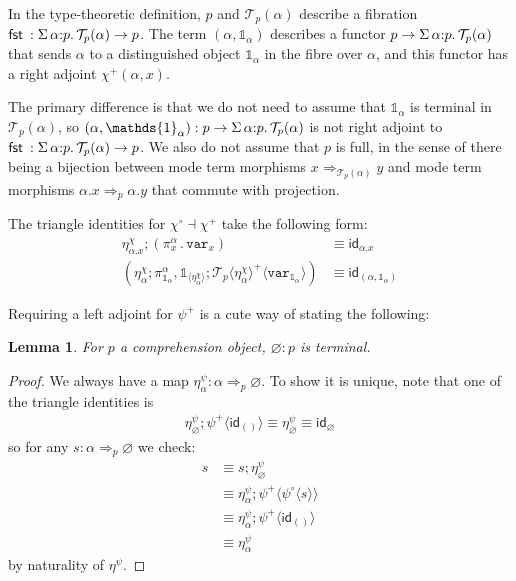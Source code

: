 \documentclass[10pt]{article}
\newtheorem{lemma}{Lemma}
\theoremstyle{definition}
\let\emptyset\varnothing
\newcommand\dsd[1]{\ensuremath{\mathsf{#1}}}
\newcommand{\tcell}{\Rightarrow}
\newcommand{\app}[2]{\ensuremath{#1 \: #2}}
\newcommand{\sigmacl}[3]{\ensuremath{\textnormal{$\Sigma$}\,#1{:}#2.\,#3}}
\newcommand{\fst}[1]{\app{\dsd{fst}}{#1}}
\newcommand{\id}{\mathsf{id}}
\newcommand\TrPlus[2]{\ensuremath{{#1}^+(#2)}}
\newcommand\El[2]{\mathcal{T}_{#1}(#2)}
\newcommand\ApEl[2]{\mathcal{T}_{#1}\langle#2\rangle}
\newcommand\bdot[0]{\mathbin{.}}
\newcommand\ApPlus[2]{\ensuremath{{#1}^+ \langle #2 \rangle }}
\newcommand\ApCirc[2]{\ensuremath{{#1}^\circ \langle #2 \rangle }}
\newcommand\One{\ensuremath{\mathds{1}}}
\newcommand\var[1]{\ensuremath{\mathtt{var}_{#1}}}
\newcommand\ApOne[1]{\ensuremath{\One_{\langle {#1} \rangle }}}
\begin{document}
In the type-theoretic definition, $p$ and $\El{p}{\alpha}$ describe a fibration $\fst : \sigmacl{\alpha}{p}{\El{p}{\alpha}} \to p$. The term $(\alpha, \One_\alpha)$ describes a functor $p \to \sigmacl{\alpha}{p}{\El{p}{\alpha}}$ that sends $\alpha$ to a distinguished object $\One_\alpha$ in the fibre over $\alpha$, and this functor has a right adjoint $\TrPlus{\chi}{\alpha,x}$.

The primary difference is that we do not need to assume that $\One_\alpha$ is terminal in $\El{p}{\alpha}$, so $(\alpha, \One_\alpha) : p \to \sigmacl{\alpha}{p}{\El{p}{\alpha}}$ is not right adjoint to $\fst : \sigmacl{\alpha}{p}{\El{p}{\alpha}} \to p$. We also do not assume that $p$ is full, in the sense of there being a bijection between mode term morphisms $x \tcell_{\El{p}{\alpha}} y$ and mode term morphisms $\alpha.x \tcell_p \alpha.y$ that commute with projection.

The triangle identities for $\chi^\circ \dashv \chi^+$ take the following form:
\begin{align}
\label{eq:chi-triangle-1} \eta^\chi_{\alpha.x};(\pi_x^\alpha \bdot \var{x}) &\equiv \id_{\alpha.x} \\
\label{eq:chi-triangle-2} (\eta^\chi_\alpha ; \pi^\alpha_{\One_\alpha}, \ApOne{\eta^\chi_\alpha} ; \ApPlus{\ApEl{p}{\eta^\chi_\alpha}}{\var{\One_\alpha}}) &\equiv \id_{(\alpha, \One_\alpha)}
\end{align}

Requiring a left adjoint for $\psi^+$ is a cute way of stating the following:
\begin{lemma}
For $p$ a comprehension object, $\emptyset : p$ is terminal.
\end{lemma}
\begin{proof}
We always have a map $\eta^\psi_\alpha : \alpha \tcell_p \emptyset$. To show it is unique, note that one of the triangle identities is 
\begin{align*}
\eta^\psi_\emptyset ; \ApPlus{\psi}{\id_{()}} \equiv \eta^\psi_\emptyset \equiv \id_\emptyset
\end{align*}
so for any $s : \alpha \tcell_p \emptyset$ we check:
\begin{align*}
s 
&\equiv s ; \eta^\psi_\emptyset \\
&\equiv \eta^\psi_\alpha ; \ApPlus{\psi}{\ApCirc{\psi}{s}} \\
&\equiv \eta^\psi_\alpha ; \ApPlus{\psi}{\id_{()}} \\
&\equiv \eta^\psi_\alpha
\end{align*}
by naturality of $\eta^\psi$.
\end{proof}
\end{document}
